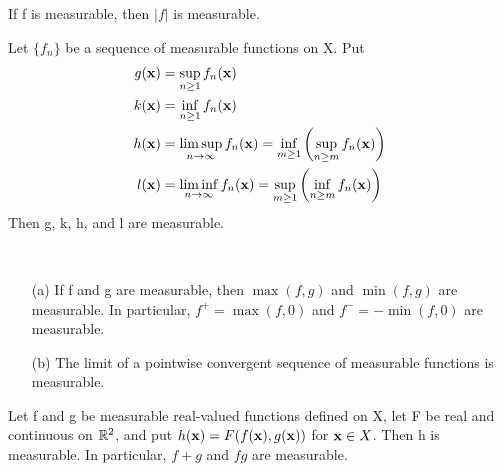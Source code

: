 \begin{theorem}
  \label{thm:chap11:abs_f_measurable}
  If f is measurable, then $|f|$ is measurable.
\end{theorem}

\begin{theorem}
  \label{thm:chap11:sup_inf_limsup_liminf_measurable}
  Let $\{ f_n \}$ be a sequence of measurable functions on X. Put
  \begin{align*}
    g(\mathbf{x}) &= \sup_{n \ge 1} f_n(\mathbf{x}) \\
    k(\mathbf{x}) &= \inf_{n \ge 1} f_n(\mathbf{x}) \\
    h(\mathbf{x}) &= \limsup_{n \to \infty} f_n(\mathbf{x}) = \inf_{m \ge
    1} \left( \sup_{n \ge m} f_n(\mathbf{x}) \right) \\
    l(\mathbf{x}) &= \liminf_{n \to \infty} f_n(\mathbf{x}) = \sup_{m \ge
    1} \left( \inf_{n \ge m} f_n(\mathbf{x}) \right)
  \end{align*}
  Then g, k, h, and l are measurable.
\end{theorem}

\begin{corollary}
  \label{cor:chap11:measurable_corollaries}
  ~ %
  \begin{itemize}
    \item[(a)] If f and g are measurable, then $\max(f, g)$ and
      $\min(f, g)$ are measurable. In particular, $f^+ = \max(f, 0)$
      and $f^- = -\min(f, 0)$ are measurable.
    \item[(b)] The limit of a pointwise convergent sequence of
      measurable functions is measurable.
  \end{itemize}
\end{corollary}



\begin{theorem}
  \label{thm:chap11:func_of_measurable}
  Let f and g be measurable real-valued functions defined on X, let F
  be real and continuous on $\mathbb{R}^2$, and put $h(\mathbf{x}) =
  F(f(\mathbf{x}), g(\mathbf{x}))$ for $\mathbf{x} \in X$. Then h is measurable.
  In particular, $f+g$ and $fg$ are measurable.
\end{theorem}

